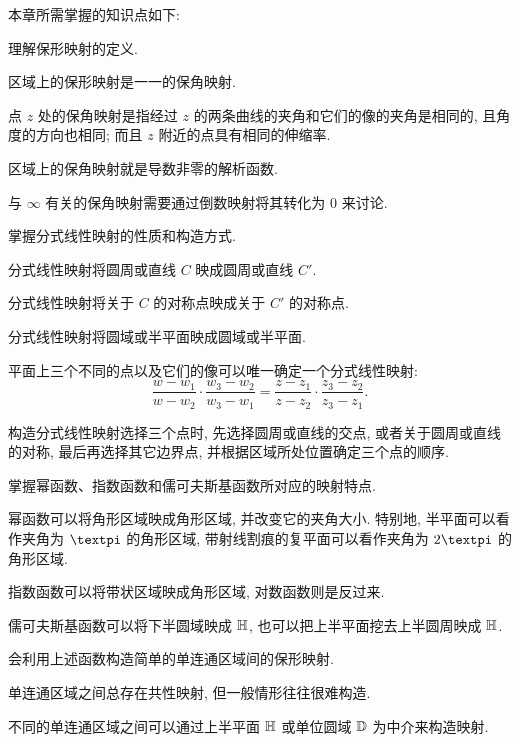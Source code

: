 本章所需掌握的知识点如下:
\begin{conclusion}
  \item 理解保形映射的定义.
  \begin{conclusion}
    \item 区域上的保形映射是一一的保角映射.
    \item 点 $z$ 处的保角映射是指经过 $z$ 的两条曲线的夹角和它们的像的夹角是相同的, 且角度的方向也相同; 而且 $z$ 附近的点具有相同的伸缩率.
    \item 区域上的保角映射就是导数非零的解析函数.
    \item 与 $\infty$ 有关的保角映射需要通过倒数映射将其转化为 $0$ 来讨论.
  \end{conclusion}
  \item 掌握分式线性映射的性质和构造方式.
  \begin{conclusion}
    \item 分式线性映射将圆周或直线 $C$ 映成圆周或直线 $C'$.
    \item 分式线性映射将关于 $C$ 的对称点映成关于 $C'$ 的对称点.
    \item 分式线性映射将圆域或半平面映成圆域或半平面.
    \item 平面上三个不同的点以及它们的像可以唯一确定一个分式线性映射:
    \[
       \frac{w-w_1}{w-w_2}\cdot\frac{w_3-w_2}{w_3-w_1}
      =\frac{z-z_1}{z-z_2}\cdot\frac{z_3-z_2}{z_3-z_1}.
    \]
    \item 构造分式线性映射选择三个点时, 先选择圆周或直线的交点, 或者关于圆周或直线的对称, 最后再选择其它边界点, 并根据区域所处位置确定三个点的顺序.
  \end{conclusion}
  \item 掌握幂函数、指数函数和儒可夫斯基函数所对应的映射特点.
  \begin{conclusion}
    \item 幂函数可以将角形区域映成角形区域, 并改变它的夹角大小.
    特别地, 半平面可以看作夹角为 $\cpi$ 的角形区域, 带射线割痕的复平面可以看作夹角为 $2\cpi$ 的角形区域.
    \item 指数函数可以将带状区域映成角形区域, 对数函数则是反过来.
    \item 儒可夫斯基函数可以将下半圆域映成 ${\mathbb{H}}$, 也可以把上半平面挖去上半圆周映成 ${\mathbb{H}}$.
  \end{conclusion}
  \item 会利用上述函数构造简单的单连通区域间的保形映射.
  \begin{conclusion}
    \item 单连通区域之间总存在共性映射, 但一般情形往往很难构造.
    \item 不同的单连通区域之间可以通过上半平面 ${\mathbb{H}}$ 或单位圆域 ${\mathbb{D}}$ 为中介来构造映射.
  \end{conclusion}
\end{conclusion}

